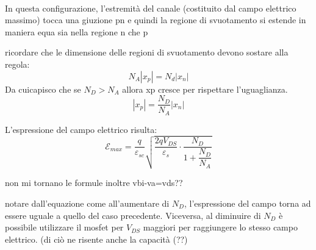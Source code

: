 \\%
In questa configurazione, l'estremità del canale (costituito dal campo elettrico massimo) tocca una giuzione pn e quindi la regione di svuotamento si estende in maniera equa sia nella regione n che p
\begin{exbox}
    ricordare che le dimensione delle regioni di svuotamento devono sostare alla regola:
    \begin{equation*}
        N_A|x_p|=N_d |x_n|
    \end{equation*}
    Da cuicapisco che se $N_D > N_A$ allora xp cresce per rispettare l'uguaglianza.
    \begin{equation*}
        |x_p|=\dfrac{N_D}{N_A} |x_n|
    \end{equation*}
\end{exbox}
L'espressione del campo elettrico risulta:
\begin{equation}
    \mathcal{E}_{max}=\dfrac{q}{\varepsilon_{sc}}\sqrt{\dfrac{2qV_{DS}}{\varepsilon_{s}}\cdot \dfrac{N_D}{1+\dfrac{N_D}{N_A}}}
\end{equation}
\begin{ricevimento}
    non mi tornano le formule inoltre vbi-va=vds??
\end{ricevimento}
notare dall'equazione come all'aumentare di $N_D$, l'espressione del campo torna ad essere uguale a quello del caso precedente. Viceversa, al diminuire di $N_D$ è possibile utilizzare il mosfet per $V_{DS}$ maggiori per raggiungere lo stesso campo elettrico. 
(di ciò ne risente anche la capacità (??)
